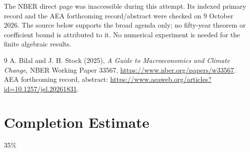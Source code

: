 \documentclass[11pt]{article}
\begin{document}
The NBER direct page was inaccessible during this attempt. Its indexed
primary record and the AEA forthcoming record/abstract were checked on
9 October 2026. The source below supports the broad agenda only; no
fifty-year theorem or coefficient bound is attributed to it. No numerical
experiment is needed for the finite algebraic results.
\begin{thebibliography}{9}
 A. Bilal and J. H. Stock (2025),
\emph{A Guide to Macroeconomics and Climate Change}, NBER Working Paper
33567, \url{https://www.nber.org/papers/w33567}.
AEA forthcoming record, abstract:
\url{https://www.aeaweb.org/articles?id=10.1257/jel.20261831}.
\end{thebibliography}

\section{Completion Estimate}
35\%
\end{document}
